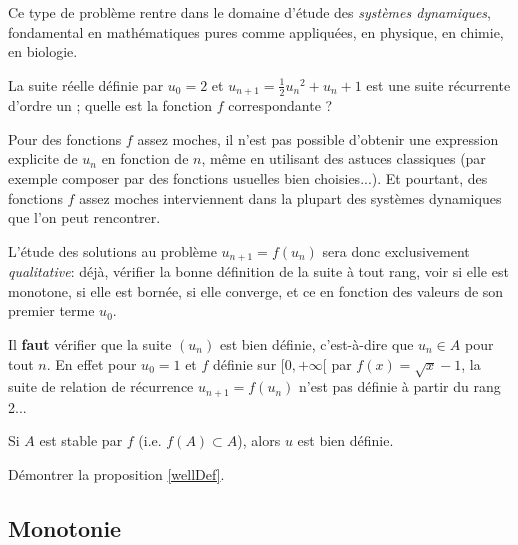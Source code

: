 \documentclass[../main.tex]{subfiles}
\begin{document}
Ce type de problème rentre dans le domaine d'étude des \textit{systèmes dynamiques}, fondamental en mathématiques pures comme appliquées, en physique, en chimie, en biologie.

\begin{exe}\label{réc1}
    La suite réelle définie par $u_0=2$ et $u_{n+1}=\frac{1}{2}{u_n}^2+u_n+1$ est une suite récurrente d'ordre un ; quelle est la fonction $f$ correspondante ?
\end{exe}

Pour des fonctions $f$ assez moches, il n'est pas possible d'obtenir une expression explicite de $u_n$ en fonction de $n$, même en utilisant des astuces classiques (par exemple composer par des fonctions usuelles bien choisies...). Et pourtant, des fonctions $f$ assez moches interviennent dans la plupart des systèmes dynamiques que l'on peut rencontrer.

L'étude des solutions au problème $u_{n+1}=f(u_n)$ sera donc exclusivement \textit{qualitative}: déjà, vérifier la bonne définition de la suite à tout rang, voir si elle est monotone, si elle est bornée, si elle converge, et ce en fonction des valeurs de son premier terme $u_0$.

\begin{rem}
    Il \textbf{faut} vérifier que la suite $(u_n)$ est bien définie, c'est-à-dire que $u_n\in A$ pour tout $n$. En effet pour $u_0=1$ et $f$ définie sur $[0,+\infty[$ par $f(x)=\sqrt{x}-1$, la suite de relation de récurrence $u_{n+1}=f(u_n)$ n'est pas définie à partir du rang 2...
\end{rem}

\begin{prop}\label{wellDef}
    Si $A$ est stable par $f$ (i.e. $f(A)\subset A$), alors $u$ est bien définie.
\end{prop}

\begin{exo}[M]
	Démontrer la proposition \ref{wellDef}.
\end{exo}

\subsection{Monotonie}
\end{document}
